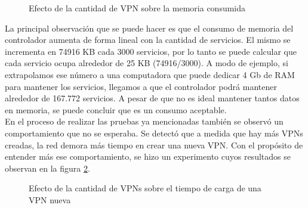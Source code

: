 \begin{figure}
\caption{Efecto de la cantidad de VPN sobre la memoria consumida}
\centering
\label{fig:consumo_de_memoria}
\end{figure}

La principal observación que se puede hacer es que el consumo de memoria del controlador aumenta de forma lineal con la cantidad de servicios. El mismo se incrementa en 74916 KB cada 3000 servicios, por lo tanto se puede calcular que cada servicio ocupa alrededor de 25 KB (74916/3000). A modo de ejemplo, si extrapolamos ese número a una computadora que puede dedicar 4 Gb de RAM para mantener los servicios, llegamos a que el controlador podrá mantener alrededor de 167.772 servicios. A pesar de que no es ideal mantener tantos datos en memoria, se puede concluir que es un consumo aceptable. \\

En el proceso de realizar las pruebas ya mencionadas también se observó un comportamiento que no se esperaba. Se detectó que a medida que hay más VPNs creadas, la red demora más tiempo en crear una nueva VPN. Con el propósito de entender más ese comportamiento, se hizo un experimento cuyos resultados se observan en la figura \ref{fig:tiempo_vpns_acumuladas}.

\begin{figure}
\caption{Efecto de la cantidad de VPNs sobre el tiempo de carga de una VPN nueva}
\centering
\label{fig:tiempo_vpns_acumuladas}
\end{figure}

